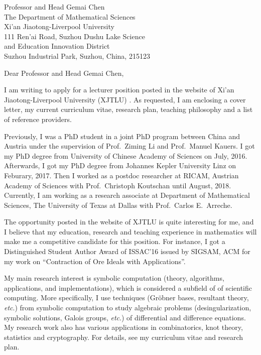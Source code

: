 \documentclass[11pt, a4paper]{letter} %
\begin{document}

\begin{letter}{
	Professor and Head Gemai Chen \\
	The Department of Mathematical Sciences\\
	Xi’an Jiaotong-Liverpool University\\
	111 Ren'ai Road, Suzhou Dushu Lake Science \\
	and Education Innovation District \\
	Suzhou Industrial Park, Suzhou, China, 215123
}


\opening{Dear Professor and Head Gemai Chen,}

I am writing to apply for a lecturer position posted in the website of Xi’an Jiaotong-Liverpool University (XJTLU) . 
As requested, I am enclosing a cover letter, my current curriculum vitae, research plan, teaching philosophy and a list of reference providers. 

Previously, I was a PhD student in a joint PhD program between China and Austria under the supervision of Prof.\ Ziming Li and Prof.\ Manuel Kauers. 
I got my PhD degree from University of Chinese Academy of Sciences on July, 2016. 
Afterwards, I got my PhD degree from Johannes Kepler University Linz on Feburary, 2017. 
Then I worked as a postdoc researcher at RICAM, Austrian Academy of Sciences with Prof.\ Christoph Koutschan until August, 2018. Currently, 
I am working as a research associate at Department of Mathematical Sciences, The University of Texas at Dallas with Prof.\ Carlos E.\ Arreche.

The opportunity posted in the website of XJTLU is quite interesting for me, 
and I believe that my education, research and teaching experience in mathematics will make me a competitive candidate for this position.
For instance, I got a Distinguished Student Author Award of ISSAC'16 issued by SIGSAM, ACM for my work on ``Contraction of Ore Ideals with Applications''. 

My main research interest is symbolic computation (theory, algorithms, applications, and implementations), 
which  is considered a subfield of  of  scientific computing. More specifically, I use techniques (Gr\"{o}bner bases, resultant theory, {\it etc}.) 
from symbolic computation to 
study algebraic problems (desingularization, symbolic solutions, Galois groups, {\it etc}.) of differential and difference equations. 
My research work also has various applications in combinatorics,  knot theory, statistics and cryptography. For details, see my curriculum vitae and research plan. 


\end{letter}
\end{document}
